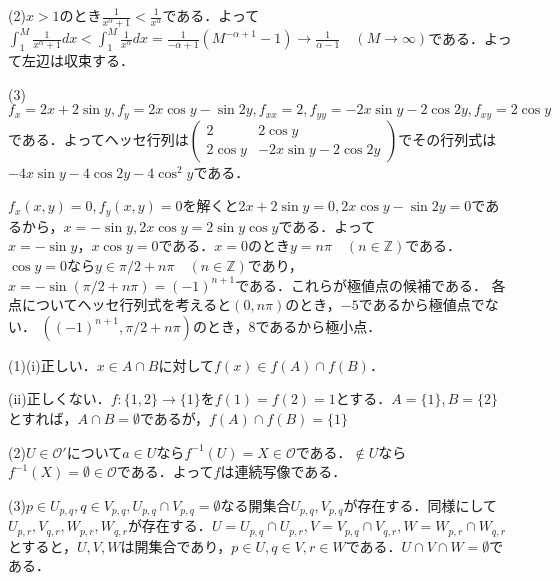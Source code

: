 \documentclass[
		book,
		head_space=20mm,
		foot_space=20mm,
		gutter=10mm,
		line_length=190mm
]{jlreq}
\begin{document}
(2)$x>1$のとき$\frac{1}{x^\alpha+1}<\frac{1}{x^\alpha}$である．よって$\int_1^M \frac{1}{x^\alpha+1}dx<\int_1^M \frac{1}{x^\alpha}dx=\frac{1}{-\alpha+1}(M^{-\alpha+1}-1)\rightarrow\frac{1}{\alpha-1}\quad(M \rightarrow \infty)$である．よって左辺は収束する．

(3)$f_x=2x+2\sin y,f_y=2x\cos y-\sin2y,f_{xx}=2,f_{yy}=-2x\sin y -2\cos 2y,f_{xy}=2\cos y$である．よってヘッセ行列は$\begin{pmatrix}
    2 & 2\cos y\\
    2\cos y & -2x\sin y -2\cos 2y
\end{pmatrix}$でその行列式は$-4x\sin y -4\cos 2y-4\cos^2 y$である．

$f_x(x,y)=0,f_y(x,y)=0$を解くと$2x+2\sin y=0,2x\cos y-\sin 2y=0$であるから，$x=-\sin y,2x\cos y=2\sin y \cos y$である．よって$x=-\sin y，x\cos y=0$である．$x=0$のとき$y=n\pi \quad(n \in \mathbb{Z})$である．$\cos y=0$なら$y \in \pi/2 + n\pi \quad(n \in \mathbb{Z})$であり，$x=-\sin (\pi/2+n\pi)=(-1)^{n+1}$である．これらが極値点の候補である．
各点についてヘッセ行列式を考えると$(0,n\pi)$のとき，$-5$であるから極値点でない．
$((-1)^{n+1},\pi/2+n\pi)$のとき，$8$であるから極小点．

(1)(i)正しい．$x \in A \cap B$に対して$f(x)\in f(A)\cap f(B)$．

(ii)正しくない．$f \colon \{ 1,2\} \rightarrow\{1\}$を$f(1)=f(2)=1$とする．$A=\{ 1\},B=\{ 2\}$とすれば，$A \cap B = \emptyset$であるが，$f(A)\cap f(B)=\{1\}$

(2)$U \in \mathcal{O}'$について$a \in U$なら$f^{-1}(U)=X \in \mathcal{O}$である．$ \notin U$なら$f^{-1}(X)=\emptyset \in \mathcal{O}$である．よって$f$は連続写像である．

(3)$p \in U_{p,q},q\in V_{p,q},U_{p,q} \cap V_{p,q}=\emptyset$なる開集合$U_{p,q},V_{p,q}$が存在する．同様にして$U_{p,r},V_{q,r},W_{p,r},W_{q,r}$が存在する．$U=U_{p,q}\cap U_{p,r},V=V_{p,q}\cap V_{q,r},W=W_{p,r}\cap W_{q,r}$とすると，$U,V,W$は開集合であり，$p \in U,q \in V,r \in W$である．$U \cap V \cap W=\emptyset$である．
\end{document}
